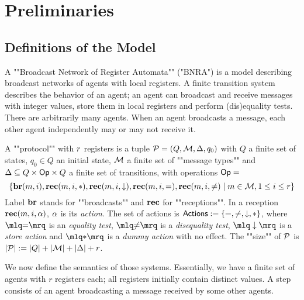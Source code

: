 \section{Preliminaries}
\label{sec:preliminaries}

\subsection{Definitions of the Model}
A ""Broadcast Network of Register Automata"" ("BNRA") \cite{DelzannoST13} is a model describing broadcast networks of agents with local registers. A finite transition system describes the behavior of an agent; an agent can broadcast and receive messages with integer values, store them in local registers and perform (dis)equality tests. 
There are arbitrarily many agents. When an agent broadcasts a message, each other agent independently may or may not receive it. 

\begin{definition}[Protocols]
	A ""protocol"" with $r$ registers is a tuple $\mathcal{P} = (Q, \mathcal{M}, \Delta, q_0)$  with $Q$ a finite set of states, $q_0 \in Q$ an initial state, $\mathcal{M}$ a finite set of ""message types""  and $\Delta \subseteq Q \times \mathsf{Op} \times Q$ a finite set of transitions, with operations $\mathsf{Op} =$
	\[
	 \{\textbf{br}(m, i), \textbf{rec}(m, i, {*}), \textbf{rec}(m, i, \downarrow), \textbf{rec}(m, i, {=}), \textbf{rec}(m, i, {\ne}) \mid m \in \mathcal{M}, 1 \leq i \leq r\}\]
	Label $\textbf{br}$ stands for ""broadcasts"" and $\textbf{rec}$ for ""receptions"".
	In a reception $\textbf{rec}(m, i, \alpha)$, $\alpha$ is its \emph{action}. 
The set of actions is $\mathsf{Actions} := \{{=}, {\ne}, \downarrow, {*}\}$, where 
$\quotemarks{\eqtestact}$ is an \emph{equality test}, $\quotemarks{\diseqtestact}$ is a \emph{disequality test}, $\quotemarks{\enregact}$ is a \emph{store action} and $\quotemarks{\dummyact}$ is a \emph{dummy action} with no effect.
The ""size"" of $\mathcal{P}$ is $|\mathcal{P}| := |Q| + |\mathcal{M}| + |\Delta| + r$.

\end{definition}

We now define the semantics of those systems. Essentially, we have a finite set of agents with $r$ registers each; all registers initially contain distinct values. A step consists of an agent broadcasting a message received by some other agents.

